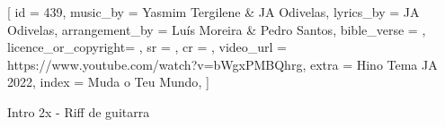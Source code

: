 [
    id                  = {439},
    music_by            = {Yasmim Tergilene & JA Odivelas}, %
    lyrics_by           = {JA Odivelas}, %
    arrangement_by      = {Luís Moreira & Pedro Santos}, %
    bible_verse         = {},
    licence_or_copyright= {},
    sr                  = {},
    cr                  = {},
    video_url           = {https://www.youtube.com/watch?v=bWgxPMBQhrg}, %
    extra               = {Hino Tema JA 2022},
    index               = {Muda o Teu Mundo},
]

\beginverse
Intro 2x - Riff de guitarra
\endverse

\beginverse

